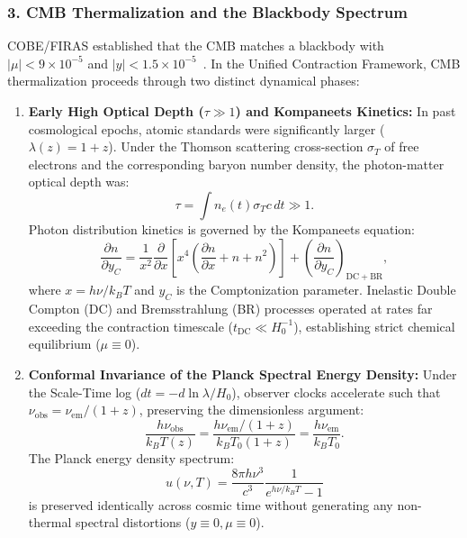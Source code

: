 \subsubsection{3. CMB Thermalization and the Blackbody Spectrum}
\label{sec:termalizasyon_cozumu}
COBE/FIRAS established that the CMB matches a blackbody with $|\mu| < 9 \times 10^{-5}$ and $|y| < 1.5 \times 10^{-5}$~\cite{fixsen1996}. In the Unified Contraction Framework, CMB thermalization proceeds through two distinct dynamical phases:
\begin{enumerate}
    \item \textbf{Early High Optical Depth ($\tau \gg 1$) and Kompaneets Kinetics:}
          In past cosmological epochs, atomic standards were significantly larger ($\lambda(z) = 1+z$). Under the Thomson scattering cross-section $\sigma_T$ of free electrons and the corresponding baryon number density, the photon-matter optical depth was:
          \begin{equation}
              \tau = \int n_e(t) \sigma_T c \, dt \gg 1.
          \end{equation}
          Photon distribution kinetics is governed by the Kompaneets equation:
          \begin{equation}
              \frac{\partial n}{\partial y_C} = \frac{1}{x^2} \frac{\partial}{\partial x} \left[ x^4 \left( \frac{\partial n}{\partial x} + n + n^2 \right) \right] + \left( \frac{\partial n}{\partial y_C} \right)_{\mathrm{DC+BR}},
          \end{equation}
          where $x = h\nu/k_B T$ and $y_C$ is the Comptonization parameter. Inelastic Double Compton (DC) and Bremsstrahlung (BR) processes operated at rates far exceeding the contraction timescale ($t_{\mathrm{DC}} \ll H_0^{-1}$), establishing strict chemical equilibrium ($\mu \equiv 0$).
    \item \textbf{Conformal Invariance of the Planck Spectral Energy Density:}
          Under the Scale-Time log ($dt = -d\ln\lambda / H_0$), observer clocks accelerate such that $\nu_{\mathrm{obs}} = \nu_{\mathrm{em}} / (1+z)$, preserving the dimensionless argument:
          \begin{equation}
              \frac{h \nu_{\mathrm{obs}}}{k_B T(z)} = \frac{h \nu_{\mathrm{em}} / (1+z)}{k_B T_0 (1+z)} = \frac{h \nu_{\mathrm{em}}}{k_B T_0}.
          \end{equation}
          The Planck energy density spectrum:
          \begin{equation}
              u(\nu, T) = \frac{8\pi h \nu^3}{c^3} \frac{1}{e^{h\nu/k_BT} - 1}
          \end{equation}
          is preserved identically across cosmic time without generating any non-thermal spectral distortions ($y \equiv 0, \mu \equiv 0$).
\end{enumerate}

